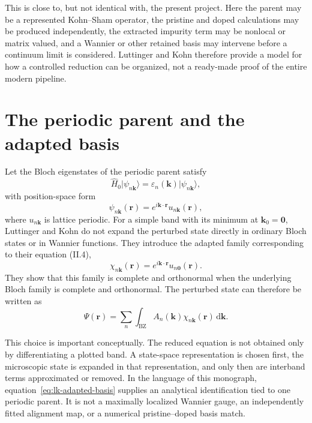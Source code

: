 This is close to, but not identical with, the present project. Here the parent
may be a represented Kohn--Sham operator, the pristine and doped calculations
may be produced independently, the extracted impurity term may be nonlocal or
matrix valued, and a Wannier or other retained basis may intervene before a
continuum limit is considered. Luttinger and Kohn therefore provide a model for
how a controlled reduction can be organized, not a ready-made proof of the
entire modern pipeline.

\section{The periodic parent and the adapted basis}

Let the Bloch eigenstates of the periodic parent satisfy
\begin{equation}
  \hat H_0\lvert\psi_{n\mathbf k}\rangle
  =
  \varepsilon_n(\mathbf k)
  \lvert\psi_{n\mathbf k}\rangle,
\end{equation}
with position-space form
\begin{equation}
  \psi_{n\mathbf k}(\mathbf r)
  =
  e^{i\mathbf k\cdot\mathbf r}
  u_{n\mathbf k}(\mathbf r),
\end{equation}
where $u_{n\mathbf k}$ is lattice periodic. For a simple band with its minimum
at $\mathbf k_0=\mathbf 0$, Luttinger and Kohn do not expand the perturbed state
directly in ordinary Bloch states or in Wannier functions. They introduce the
adapted family corresponding to their equation (II.4),
\begin{equation}
  \chi_{n\mathbf k}(\mathbf r)
  =
  e^{i\mathbf k\cdot\mathbf r}u_{n\mathbf 0}(\mathbf r).
  \label{eq:lk-adapted-basis}
\end{equation}
They show that this family is complete and orthonormal when the underlying
Bloch family is complete and orthonormal. The perturbed state can therefore be
written as
\begin{equation}
  \Psi(\mathbf r)
  =
  \sum_n\int_{\mathrm{BZ}}
  A_n(\mathbf k)\chi_{n\mathbf k}(\mathbf r)\,\mathrm{d}\mathbf k.
  \label{eq:lk-state-expansion}
\end{equation}

This choice is important conceptually. The reduced equation is not obtained
only by differentiating a plotted band. A state-space representation is chosen
first, the microscopic state is expanded in that representation, and only then
are interband terms approximated or removed. In the language of this
monograph, equation~\eqref{eq:lk-adapted-basis} supplies an analytical
identification tied to one periodic parent. It is not a maximally localized
Wannier gauge, an independently fitted alignment map, or a numerical
pristine--doped basis match.

